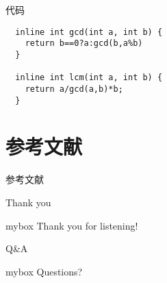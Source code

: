 \documentclass[UTF8,10pt,aspectratio=43]{ctexbeamer}
\begin{document}
\begin{frame}[fragile]{代码}
\begin{lstlisting}
  inline int gcd(int a, int b) { 
    return b==0?a:gcd(b,a%b)
  }

  inline int lcm(int a, int b) {
    return a/gcd(a,b)*b;
  }
\end{lstlisting}
\end{frame}

\section*{参考文献}
\begin{frame}{参考文献}
  \tiny
  
  
\end{frame}

\begin{frame}{Thank you}
  \begin{center}
    \begin{minipage}{1\textwidth}
      \begin{beamercolorbox}[wd=0.70\textwidth, rounded=true, shadow=true]{mybox}
      \LARGE \centering Thank you for listening!  %
      \end{beamercolorbox}
    \end{minipage}
    \end{center}
\end{frame}

\begin{frame}{Q\&A}
\begin{center}
	\begin{minipage}{1\textwidth}
		\begin{beamercolorbox}[wd=0.70\textwidth, rounded=true, shadow=true]{mybox}
			\LARGE \centering  Questions?  %
		\end{beamercolorbox}
	\end{minipage}
\end{center}
\end{frame}
\end{document}
